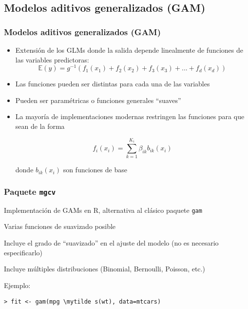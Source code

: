 \documentclass{beamer}
\newcommand{\mytilde}{$\sim$}
\newcommand{\Ebb}{\ensuremath{\mathbb{E}}}
\newenvironment{wideitemize}{\itemize\addtolength{\itemsep}{12pt}}{\enditemize}
\begin{document}
\subsection{Modelos aditivos generalizados (GAM)}
\begin{frame}
\frametitle{Modelos aditivos generalizados (GAM)}

\begin{itemize}
\item Extensión de los GLMs donde la salida depende linealmente de funciones de las variables predictoras:
%
$$\Ebb(y) = g^{-1}(f_1(x_1) + f_2(x_2) + f_3(x_3) + ... + f_d(x_d))$$

\item Las funciones pueden ser distintas para cada una de las variables

\item Pueden ser paramétricas o funciones generales ``suaves''

\item La mayoría de implementaciones modernas restringen las funciones para que sean de la forma

$$f_i(x_i) = \sum_{k=1}^{K_i}\beta_{ik}b_{ik}(x_i)$$

donde $b_{ik}(x_i)$ son funciones de base

\end{itemize}
\end{frame}


\begin{frame}[fragile]
\frametitle{Paquete \texttt{mgcv}}

\begin{wideitemize}
\item Implementación de GAMs en R, alternativa al clásico paquete \texttt{gam}

\item Varias funciones de suavizado posible

\item Incluye el grado de ``suavizado'' en el ajuste del modelo (no es necesario especificarlo)

\item Incluye múltiples distribuciones (Binomial, Bernoulli, Poisson, etc.)

\item Ejemplo:
\begin{Verbatim}[commandchars=\\\{\}]
   > fit <- gam(mpg \mytilde s(wt), data=mtcars)
\end{Verbatim}

\end{wideitemize}

\end{frame}
\end{document}
